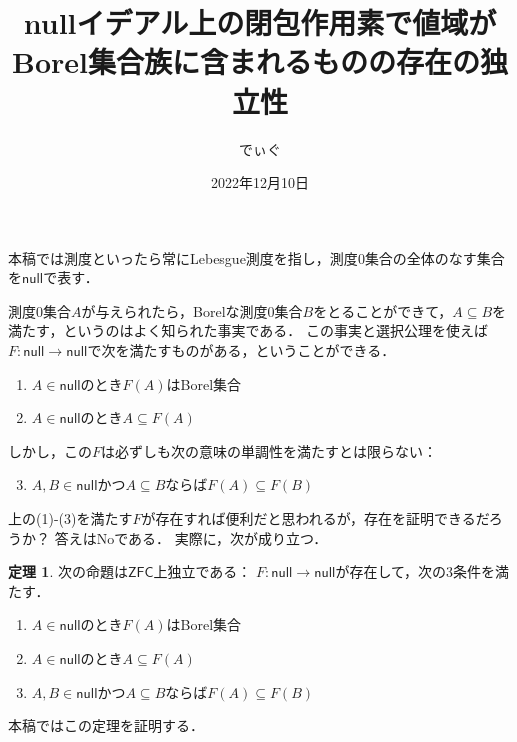 \documentclass[uplatex,dvipdfmx]{jsarticle}
\title{nullイデアル上の閉包作用素で値域がBorel集合族に含まれるものの存在の独立性}
\author{でぃぐ}
\date{2022年12月10日}
\newcommand{\nul}{\mathsf{null}}
\newcommand{\ZFC}{\mathsf{ZFC}}
\renewcommand\subset{\subseteq}
\theoremstyle{definition}
\newtheorem{thm}{定理}
\begin{document}
	\maketitle
	
	本稿では測度といったら常にLebesgue測度を指し，測度$0$集合の全体のなす集合を$\nul$で表す．
	
	測度$0$集合$A$が与えられたら，Borelな測度$0$集合$B$をとることができて，$A \subset B$を満たす，というのはよく知られた事実である．
	この事実と選択公理を使えば$F \colon \nul \to \nul$で次を満たすものがある，ということができる．
	\begin{enumerate}
		\item $A \in \nul$のとき$F(A)$はBorel集合
		\item $A \in \nul$のとき$A \subset F(A)$
	\end{enumerate}
	しかし，この$F$は必ずしも次の意味の単調性を満たすとは限らない：
	\begin{enumerate}
	\setcounter{enumi}{2}
		\item $A, B \in \nul$かつ$A \subset B$ならば$F(A) \subset F(B)$
	\end{enumerate}
	上の(1)-(3)を満たす$F$が存在すれば便利だと思われるが，存在を証明できるだろうか？ 答えはNoである．
	実際に，次が成り立つ．
	
	\begin{thm}\label{thm:mainthm}
		次の命題は$\ZFC$上独立である：
		$F \colon \nul \to \nul$が存在して，次の3条件を満たす．
		\begin{enumerate}
			\item $A \in \nul$のとき$F(A)$はBorel集合
			\item $A \in \nul$のとき$A \subset F(A)$
			\item $A, B \in \nul$かつ$A \subset B$ならば$F(A) \subset F(B)$
		\end{enumerate}
	\end{thm}

	本稿ではこの定理を証明する．
	
\end{document}
